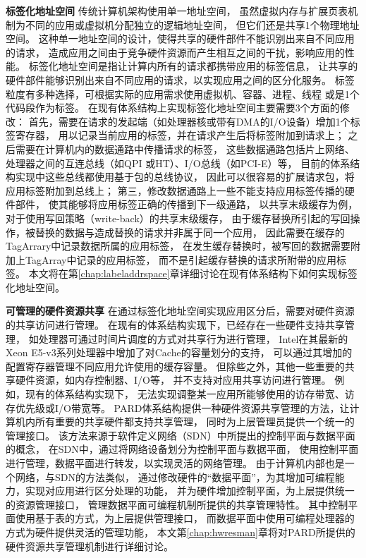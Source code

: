 \textbf{标签化地址空间}\quad
传统计算机架构使用单一地址空间，
虽然虚拟内存与扩展页表机制为不同的应用或虚拟机分配独立的逻辑地址空间，
但它们还是共享1个物理地址空间。
这种单一地址空间的设计，使得共享的硬件部件不能识别出来自不同应用的请求，
造成应用之间由于竞争硬件资源而产生相互之间的干扰，影响应用的性能。
标签化地址空间是指让计算内所有的请求都携带应用的标签信息，
让共享的硬件部件能够识别出来自不同应用的请求，以实现应用之间的区分化服务。
标签粒度有多种选择，可根据实际的应用需求使用虚拟机、容器、进程、线程
或是1个代码段作为标签。
在现有体系结构上实现标签化地址空间主要需要3个方面的修改：
首先，需要在请求的发起端（如处理器核或带有DMA的I/O设备）增加1个标签寄存器，
用以记录当前应用的标签，并在请求产生后将标签附加到请求上；
之后需要在计算机内的数据通路中传播请求的标签，
这些数据通路包括片上网络、处理器之间的互连总线（如QPI\cite{intel-qpi-spec}
或HT\cite{ht-spec}）、I/O总线（如PCI-E\cite{pcisig_pcie_spec}）等，
目前的体系结构实现中这些总线都使用基于包的总线协议，
因此可以很容易的扩展请求包，将应用标签附加到总线上；
第三，修改数据通路上一些不能支持应用标签传播的硬件部件，
使其能够将应用标签正确的传播到下一级通路，
以共享末级缓存为例，对于使用写回策略（write-back）的共享末级缓存，
由于缓存替换所引起的写回操作，被替换的数据与造成替换的请求并非属于同一个应用，
因此需要在缓存的TagArrary中记录数据所属的应用标签，
在发生缓存替换时，被写回的数据需要附加上TagArray中记录的应用标签，
而不是引起缓存替换的请求所附带的应用标签。
本文将在第\ref{chap:labeladdrspace}章详细讨论在现有体系结构下如何实现标签化地址空间。


\textbf{可管理的硬件资源共享}\quad
在通过标签化地址空间实现应用区分后，需要对硬件资源的共享访问进行管理。
在现有的体系结构实现下，已经存在一些硬件支持共享管理，
如处理器可通过时间片调度的方式对共享行为进行管理，
Intel在其最新的Xeon E5-v3系列处理器中增加了对Cache的容量划分的支持\cite{intel-cat}，
可以通过其增加的配置寄存器管理不同应用允许使用的缓存容量。
但除些之外，其他一些重要的共享硬件资源，如内存控制器、I/O等，
并不支持对应用共享访问进行管理。
例如，现有的体系结构实现下，
无法实现调整某一应用所能够使用的访存带宽、访存优先级或I/O带宽等。
PARD体系结构提供一种硬件资源共享管理的方法，让计算机内所有重要的共享硬件都支持共享管理，
同时为上层管理员提供一个统一的管理接口。
该方法来源于软件定义网络（SDN）中所提出的控制平面与数据平面的概念，
在SDN中，通过将网络设备划分为控制平面与数据平面，
使用控制平面进行管理，数据平面进行转发，以实现灵活的网络管理。
由于计算机内部也是一个网络，与SDN的方法类似，
通过修改硬件的``数据平面''，为其增加可编程能力，实现对应用进行区分处理的功能，
并为硬件增加控制平面，为上层提供统一的资源管理接口，
管理数据平面可编程机制所提供的共享管理特性。
其中控制平面使用基于表的方式，为上层提供管理接口，
而数据平面中使用可编程处理器的方式为硬件提供灵活的管理功能，
本文第\ref{chap:hwresman}章将对PARD所提供的硬件资源共享管理机制进行详细讨论。

